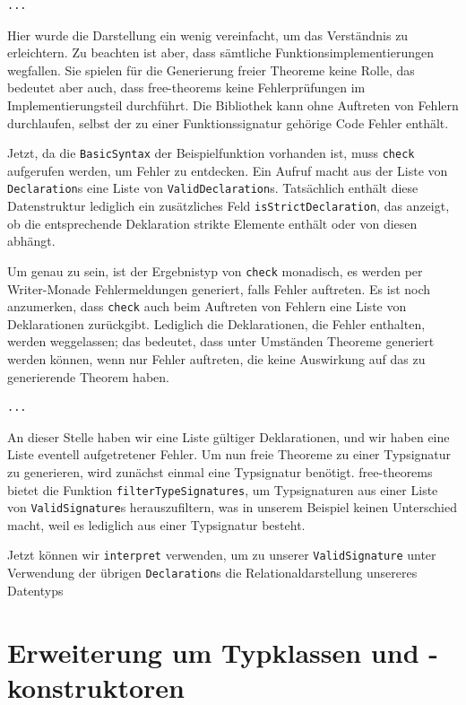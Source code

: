 \documentclass[11pt]{article} %
\begin{document}
\begin{verbatim}
...
\end{verbatim}

Hier wurde die Darstellung ein wenig vereinfacht, um das Verständnis zu erleichtern. Zu beachten ist aber, dass sämtliche
Funktionsimplementierungen wegfallen. Sie spielen für die Generierung freier Theoreme keine Rolle, das bedeutet aber auch,
dass free-theorems keine Fehlerprüfungen im Implementierungsteil durchführt. Die Bibliothek kann ohne Auftreten von Fehlern
durchlaufen, selbst der zu einer Funktionssignatur gehörige Code Fehler enthält.

Jetzt, da die \texttt{BasicSyntax} der Beispielfunktion vorhanden ist, muss \texttt{check} aufgerufen werden, um Fehler
zu entdecken. Ein Aufruf macht aus der Liste von \texttt{Declaration}s eine Liste von \texttt{ValidDeclaration}s. Tatsächlich
enthält diese Datenstruktur lediglich ein zusätzliches Feld \texttt{isStrictDeclaration}, das anzeigt, ob die entsprechende
Deklaration strikte Elemente enthält oder von diesen abhängt.

Um genau zu sein, ist der Ergebnistyp von \texttt{check} monadisch, es werden per Writer-Monade Fehlermeldungen
generiert, falls Fehler auftreten. Es ist noch anzumerken, dass \texttt{check} auch beim Auftreten von Fehlern eine Liste
von Deklarationen zurückgibt. Lediglich die Deklarationen, die Fehler enthalten, werden weggelassen; das bedeutet, dass
unter Umständen Theoreme generiert werden können, wenn nur Fehler auftreten, die keine Auswirkung auf das zu generierende
Theorem haben.

\begin{verbatim}
...
\end{verbatim}

An dieser Stelle haben wir eine Liste gültiger Deklarationen, und wir haben eine Liste eventell aufgetretener Fehler. Um nun
freie Theoreme zu einer Typsignatur zu generieren, wird zunächst einmal eine Typsignatur benötigt. free-theorems bietet die
Funktion \texttt{filterTypeSignatures}, um Typsignaturen aus einer Liste von \texttt{ValidSignature}s herauszufiltern, was in
unserem Beispiel keinen Unterschied macht, weil es lediglich aus einer Typsignatur besteht.

Jetzt können wir \texttt{interpret} verwenden, um zu unserer \texttt{ValidSignature} unter Verwendung der übrigen
\texttt{Declaration}s die Relationaldarstellung unsereres Datentyps

\section{Erweiterung um Typklassen und -konstruktoren}
\label{sec:erweiterung-typklassen}
\end{document}
